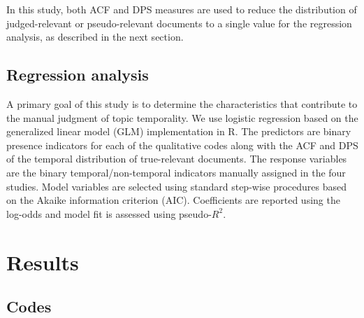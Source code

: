 \documentclass{sig-alternate}
\begin{document}
In this study, both ACF and DPS measures are used to reduce the distribution of judged-relevant or pseudo-relevant documents to a single value for the regression analysis, as described in the next section.

\subsection{Regression analysis}

A primary goal of this study is to determine the characteristics that contribute to the manual judgment of topic temporality. We use logistic regression based on the generalized linear model (GLM) implementation in R. The predictors are binary presence indicators for each of the qualitative codes along with the ACF and DPS of the temporal distribution of true-relevant documents.  The response variables are the binary temporal/non-temporal indicators manually assigned in the four studies.  Model variables are selected using standard step-wise procedures based on the Akaike information criterion (AIC). Coefficients are reported using the log-odds and model fit is assessed using pseudo-$R^2$.

\section{Results}


\subsection{Codes}
\end{document}

